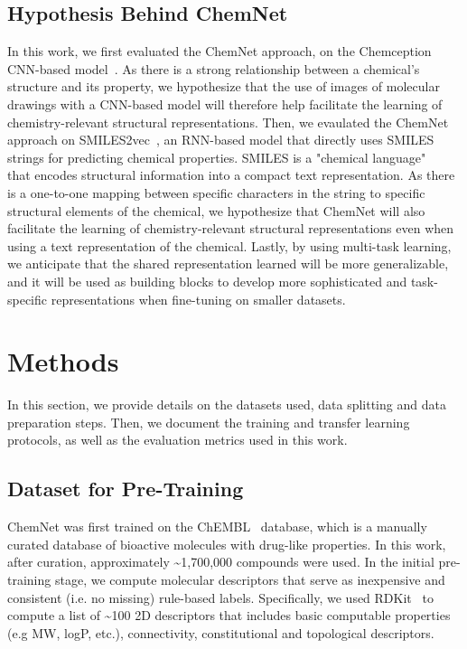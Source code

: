 \documentclass[sigconf]{acmart}
\begin{document}
\subsection{Hypothesis Behind ChemNet}
In this work, we first evaluated the ChemNet approach, on the Chemception CNN-based model~\cite{goh2017c1,goh2017c2}. As there is a strong relationship between a chemical's structure and its property, we hypothesize that the use of images of molecular drawings with a CNN-based model will therefore help facilitate the learning of chemistry-relevant structural representations. Then, we evaulated the ChemNet approach on SMILES2vec~\cite{goh2017s}, an RNN-based model that directly uses SMILES strings for predicting chemical properties. SMILES is a "chemical language" ~\cite{weininger1988} that encodes structural information into a compact text representation. As there is a one-to-one mapping between specific characters in the string to specific structural elements of the chemical, we hypothesize that ChemNet will also facilitate the learning of chemistry-relevant structural representations even when using a text representation of the chemical. Lastly, by using multi-task learning, we anticipate that the shared representation learned will be more generalizable, and it will be used as building blocks to develop more sophisticated and task-specific representations when fine-tuning on smaller datasets.

\section{Methods}
\label{sec:background}

In this section, we provide details on the datasets used, data splitting and data preparation steps. Then, we document the training and transfer learning protocols, as well as the evaluation metrics used in this work.

\subsection{Dataset for Pre-Training}
ChemNet was first trained on the ChEMBL~\cite{gaulton2011} database, which is a manually curated database of bioactive molecules with drug-like properties. In this work, after curation, approximately \textasciitilde1,700,000 compounds were used. In the initial pre-training stage, we compute molecular descriptors that serve as inexpensive and consistent (i.e. no missing) rule-based labels. Specifically, we used RDKit~\cite{landrum2016} to compute a list of \textasciitilde100 2D descriptors that includes basic computable properties (e.g MW, logP, etc.), connectivity, constitutional and topological descriptors.
\end{document}
